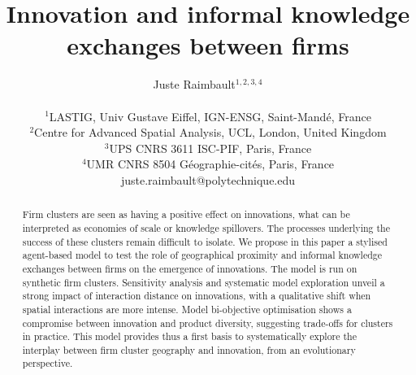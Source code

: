 \documentclass[letterpaper]{article}
\title{Innovation and informal knowledge exchanges between firms}
\author{Juste Raimbault$^{1,2,3,4}$\\
\mbox{}\\
$^1$LASTIG, Univ Gustave Eiffel, IGN-ENSG, Saint-Mand{\'e}, France\\
$^2$Centre for Advanced Spatial Analysis, UCL, London, United Kingdom\\
$^3$UPS CNRS 3611 ISC-PIF, Paris, France\\
$^4$UMR CNRS 8504 G{\'e}ographie-cit{\'e}s, Paris, France\medskip\\
juste.raimbault@polytechnique.edu}
\begin{document}
\maketitle

\begin{abstract}
Firm clusters are seen as having a positive effect on innovations, what can be interpreted as economies of scale or knowledge spillovers. The processes underlying the success of these clusters remain difficult to isolate. We propose in this paper a stylised agent-based model to test the role of geographical proximity and informal knowledge exchanges between firms on the emergence of innovations. The model is run on synthetic firm clusters. Sensitivity analysis and systematic model exploration unveil a strong impact of interaction distance on innovations, with a qualitative shift when spatial interactions are more intense. Model bi-objective optimisation shows a compromise between innovation and product diversity, suggesting trade-offs for clusters in practice. This model provides thus a first basis to systematically explore the interplay between firm cluster geography and innovation, from an evolutionary perspective.
\end{abstract}





\end{document}
